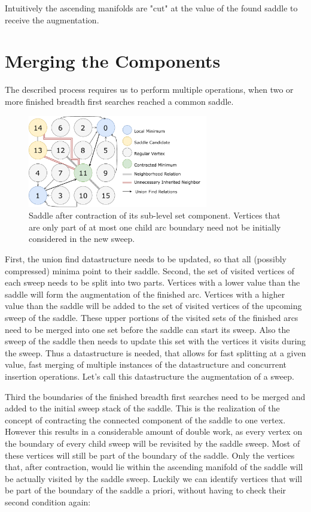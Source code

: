 \documentclass[%
	paper=A4,					%
	twoside=true,				%
	openright,					%
	parskip=full,				%
	chapterprefix=true,			%
	11pt,						%
	headings=normal,			%
	bibliography=totoc,			%
	listof=totoc,				%
	titlepage=on,				%
	captions=tableabove,		%
	draft=false,				%
]{scrreprt}%
\begin{document}
Intuitively the ascending manifolds are "cut" at the value of the found saddle to receive the augmentation.

\section{Merging the Components}
The described process requires us to perform multiple operations, when two or more finished breadth first searches reached a common saddle. 

\begin{figure}[h!]
\centering
\includegraphics[width=0.7\textwidth]{figures/Unnes.pdf}
\caption{Saddle after contraction of its sub-level set component. Vertices that are only part of at most one child arc boundary need not be initially considered in the new sweep.}
\label{fig:un}
\end{figure}

First, the union find datastructure needs to be updated, so that all (possibly compressed) minima point to their saddle. Second, the set of visited vertices of each sweep needs to be split into two parts. Vertices with a lower value than the saddle will form the augmentation of the finished arc. Vertices with a higher value than the saddle will be added to the set of visited vertices of the upcoming sweep of the saddle. These upper portions of the visited sets of the finished arcs need to be merged into one set before the saddle can start its sweep. Also the sweep of the saddle then needs to update this set with the vertices it visits during the sweep. Thus a datastructure is needed, that allows for fast splitting at a given value, fast merging of multiple instances of the datastructure and concurrent insertion operations. Let's call this datastructure the augmentation of a sweep.

Third the boundaries of the finished breadth first searches need to be merged and added to the initial sweep stack of the saddle. This is the realization of the concept of contracting the connected component of the saddle to one vertex. However this results in a considerable amount of double work, as every vertex on the boundary of every child sweep will be revisited by the saddle sweep. Most of these vertices will still be part of the boundary of the saddle. Only the vertices that, after contraction, would lie within the ascending manifold of the saddle will be actually visited by the saddle sweep. Luckily we can identify vertices that will be part of the boundary of the saddle a priori, without having to check their second condition again:
\end{document}
